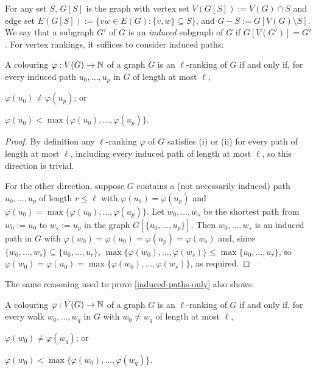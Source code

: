 \documentclass[kpfonts]{patmorin}
\theoremstyle{named}
\begin{document}
For any set $S$, $G[S]$ is the graph with vertex set $V(G[S]):=V(G)\cap S$ and edge set $E(G[S]):=\{vw\in E(G): \{v,w\}\subseteq S\}$, and $G-S:=G[V(G)\setminus S]$.  We say that a subgraph $G'$ of $G$ is an \emph{induced} subgraph of $G$ if $G[V(G')]=G'$.  For vertex rankings, it suffices to consider induced paths:

\begin{obs}\label{induced-paths-only}
    A colouring $\varphi:V(G)\to\mathbb{N}$ of a graph $G$ is an $\ell$-ranking of $G$ if and only if, for every induced path $u_0,\ldots,u_p$ in $G$ of length at most $\ell$,
    \begin{inparaenum}[(i)]
        \item $\varphi(u_0)\neq\varphi(u_p)$; or
        \item $\varphi(u_0)<\max\{\varphi(u_0),\ldots,\varphi(u_p)\}$.
    \end{inparaenum}
\end{obs}

\begin{proof}
    By definition any $\ell$-ranking $\varphi$ of $G$ satisfies (i) or (ii) for every path of length at most $\ell$, including every induced path of length at most $\ell$, so this direction is trivial.

    For the other direction, suppose $G$ contains a (not necessarily induced) path $u_0,\ldots,u_p$ of length $r\le\ell$ with $\varphi(u_0)=\varphi(u_p)$ and $\varphi(u_0)=\max\{\varphi(u_0),\ldots,\varphi(u_p)\}$.  Let $w_0,\ldots,w_s$ be the shortest path from $w_0:=u_0$ to $w_s:=u_p$ in  the graph $G[\{u_0,\ldots,u_p\}]$.  Then $w_0,\ldots,w_s$ is an induced path in $G$ with $\varphi(w_0)=\varphi(u_0)=\varphi(u_p)=\varphi(w_s)$ and, since $\{w_0,\ldots,w_{s}\}\subseteq\{u_0,\ldots,u_{r}\}$, $\max\{\varphi(w_0),\ldots,\varphi(w_{s})\}\le\max\{u_0,\ldots,u_{r}\}$, so $\varphi(w_0)=\varphi(u_0)=\max\{\varphi(w_0),\ldots,\varphi(w_s)\}$, as required.
\end{proof}

The same reasoning used to prove \cref{induced-paths-only} also shows:

\begin{obs}\label{walks-too}
    A colouring $\varphi:V(G)\to\mathbb{N}$ of a graph $G$ is an $\ell$-ranking of $G$ if and only if, for every walk $w_0,\ldots,w_q$ in $G$ with $w_0\neq w_q$ of length at most $\ell$,
    \begin{inparaenum}[(i)]
        \item $\varphi(w_0)\neq\varphi(w_q)$; or
        \item $\varphi(w_0)<\max\{\varphi(w_0),\ldots,\varphi(w_q)\}$.
    \end{inparaenum}
\end{obs}
\end{document}
